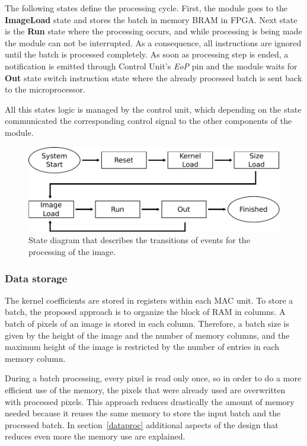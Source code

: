 \documentclass[conference,compsoc]{IEEEtran}
\begin{document}
The following states define the processing cycle. First, the module goes to the
\textbf{ImageLoad} state and stores the batch in memory BRAM in FPGA. Next state
is the \textbf{Run} state where the processing occurs, and while processing is
being made the module can not be interrupted. As a consequence, all instructions
are ignored until the batch is processed completely. As soon as processing step
is ended, a notification is emitted through Control Unit's \textit{EoP} pin and
the module waits for \textbf{Out} state switch instruction state where the
already processed batch is sent back to the microprocessor.

All this states logic is managed by the control unit, which depending on the
state communicated the corresponding control signal to the other components
of the module.

\begin{figure}[!t]
  \centering
  \includegraphics[scale=0.55]{states.pdf}
  \caption{State diagram that describes the transitions of events for the
    processing of the image.}
  \label{state}
\end{figure}

\subsubsection{Data storage}\label{infstorage}
The kernel coefficients are stored in registers within each MAC unit. To store a
batch, the proposed approach is to organize the block of RAM in columns. A batch
of pixels of an image is stored in each column. Therefore, a batch size is given
by the height of the image and the number of memory columns, and the maximum
height of the image is restricted by the number of entries in each memory
column.

During a batch processing, every pixel is read only once, so in order to do a
more efficient use of the memory, the pixels that were already used are
overwritten with processed pixels. This approach reduces drastically the amount
of memory needed because it reuses the same memory to store the input batch and the
processed batch. In section~\ref{dataproc} additional aspects of the design
that reduces even more the memory use are explained.
\end{document}
